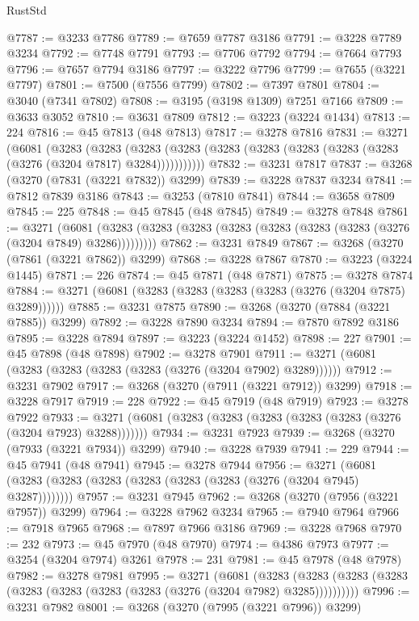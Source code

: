 \begin{lexlean}{RustStd}
\begin{coremodule}
@7787 := @3233 @7786
@7789 := @7659 @7787 @3186
@7791 := @3228 @7789 @3234
@7792 := @7748 @7791
@7793 := @7706 @7792
@7794 := @7664 @7793
@7796 := @7657 @7794 @3186
@7797 := @3222 @7796
@7799 := @7655 (@3221 @7797)
@7801 := @7500 (@7556 @7799)
@7802 := @7397 @7801
@7804 := @3040 (@7341 @7802)
@7808 := @3195 (@3198 @1309) @7251 @7166
@7809 := @3633 @3052
@7810 := @3631 @7809
@7812 := @3223 (@3224 @1434)
@7813 := 224
@7816 := @45 @7813 (@48 @7813)
@7817 := @3278 @7816
@7831 := @3271
    (@6081
      (@3283
        (@3283
          (@3283 (@3283 (@3283 (@3283 (@3283 (@3283 (@3283 (@3276 (@3204 @7817) @3284)))))))))))
@7832 := @3231 @7817
@7837 := @3268 (@3270 (@7831 (@3221 @7832)) @3299)
@7839 := @3228 @7837 @3234
@7841 := @7812 @7839 @3186
@7843 := @3253 (@7810 @7841)
@7844 := @3658 @7809
@7845 := 225
@7848 := @45 @7845 (@48 @7845)
@7849 := @3278 @7848
@7861 := @3271
    (@6081 (@3283 (@3283 (@3283 (@3283 (@3283 (@3283 (@3283 (@3276 (@3204 @7849) @3286)))))))))
@7862 := @3231 @7849
@7867 := @3268 (@3270 (@7861 (@3221 @7862)) @3299)
@7868 := @3228 @7867
@7870 := @3223 (@3224 @1445)
@7871 := 226
@7874 := @45 @7871 (@48 @7871)
@7875 := @3278 @7874
@7884 := @3271 (@6081 (@3283 (@3283 (@3283 (@3283 (@3276 (@3204 @7875) @3289))))))
@7885 := @3231 @7875
@7890 := @3268 (@3270 (@7884 (@3221 @7885)) @3299)
@7892 := @3228 @7890 @3234
@7894 := @7870 @7892 @3186
@7895 := @3228 @7894
@7897 := @3223 (@3224 @1452)
@7898 := 227
@7901 := @45 @7898 (@48 @7898)
@7902 := @3278 @7901
@7911 := @3271 (@6081 (@3283 (@3283 (@3283 (@3283 (@3276 (@3204 @7902) @3289))))))
@7912 := @3231 @7902
@7917 := @3268 (@3270 (@7911 (@3221 @7912)) @3299)
@7918 := @3228 @7917
@7919 := 228
@7922 := @45 @7919 (@48 @7919)
@7923 := @3278 @7922
@7933 := @3271 (@6081 (@3283 (@3283 (@3283 (@3283 (@3283 (@3276 (@3204 @7923) @3288)))))))
@7934 := @3231 @7923
@7939 := @3268 (@3270 (@7933 (@3221 @7934)) @3299)
@7940 := @3228 @7939
@7941 := 229
@7944 := @45 @7941 (@48 @7941)
@7945 := @3278 @7944
@7956 := @3271 (@6081 (@3283 (@3283 (@3283 (@3283 (@3283 (@3283 (@3276 (@3204 @7945) @3287))))))))
@7957 := @3231 @7945
@7962 := @3268 (@3270 (@7956 (@3221 @7957)) @3299)
@7964 := @3228 @7962 @3234
@7965 := @7940 @7964
@7966 := @7918 @7965
@7968 := @7897 @7966 @3186
@7969 := @3228 @7968
@7970 := 232
@7973 := @45 @7970 (@48 @7970)
@7974 := @4386 @7973
@7977 := @3254 (@3204 @7974) @3261
@7978 := 231
@7981 := @45 @7978 (@48 @7978)
@7982 := @3278 @7981
@7995 := @3271
    (@6081
      (@3283 (@3283 (@3283 (@3283 (@3283 (@3283 (@3283 (@3283 (@3276 (@3204 @7982) @3285))))))))))
@7996 := @3231 @7982
@8001 := @3268 (@3270 (@7995 (@3221 @7996)) @3299)

\end{coremodule}
\end{lexlean}
